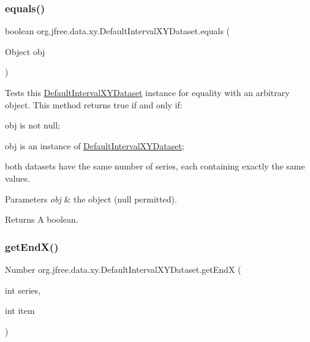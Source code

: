 \subsubsection{\texorpdfstring{equals()}{equals()}}
{\footnotesize\ttfamily boolean org.\+jfree.\+data.\+xy.\+Default\+Interval\+X\+Y\+Dataset.\+equals (\begin{DoxyParamCaption}\item[{Object}]{obj }\end{DoxyParamCaption})}

Tests this {\ttfamily \mbox{\hyperlink{classorg_1_1jfree_1_1data_1_1xy_1_1_default_interval_x_y_dataset}{Default\+Interval\+X\+Y\+Dataset}}} instance for equality with an arbitrary object. This method returns {\ttfamily true} if and only if\+: 
\begin{DoxyItemize}
\item {\ttfamily obj} is not {\ttfamily null}; 
\item {\ttfamily obj} is an instance of {\ttfamily \mbox{\hyperlink{classorg_1_1jfree_1_1data_1_1xy_1_1_default_interval_x_y_dataset}{Default\+Interval\+X\+Y\+Dataset}}}; 
\item both datasets have the same number of series, each containing exactly the same values. 
\end{DoxyItemize}


\begin{DoxyParams}{Parameters}
{\em obj} & the object ({\ttfamily null} permitted).\\
\hline
\end{DoxyParams}
\begin{DoxyReturn}{Returns}
A boolean. 
\end{DoxyReturn}
\mbox{\label{classorg_1_1jfree_1_1data_1_1xy_1_1_default_interval_x_y_dataset_aadfc488215db1fe288e23180b78d5d67}} 
\subsubsection{\texorpdfstring{get\+End\+X()}{getEndX()}}
{\footnotesize\ttfamily Number org.\+jfree.\+data.\+xy.\+Default\+Interval\+X\+Y\+Dataset.\+get\+EndX (\begin{DoxyParamCaption}\item[{int}]{series,  }\item[{int}]{item }\end{DoxyParamCaption})}


